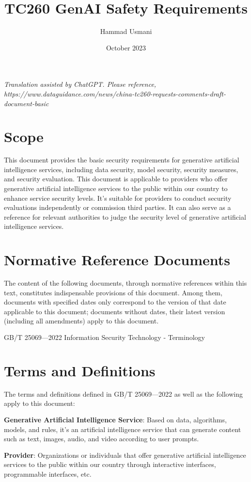 \documentclass{article}
\title{TC260 GenAI Safety Requirements}
\author{Hammad Usmani}
\date{October 2023}
\begin{document}
\maketitle

\tableofcontents
\newpage


\textit{Translation assisted by ChatGPT. Please reference, \\
https://www.dataguidance.com/news/china-tc260-requests-comments-draft-document-basic}

\section{Scope}
This document provides the basic security requirements for generative artificial intelligence services, including data security, model security, security measures, and security evaluation. This document is applicable to providers who offer generative artificial intelligence services to the public within our country to enhance service security levels. It's suitable for providers to conduct security evaluations independently or commission third parties. It can also serve as a reference for relevant authorities to judge the security level of generative artificial intelligence services.

\section{Normative Reference Documents}
The content of the following documents, through normative references within this text, constitutes indispensable provisions of this document. Among them, documents with specified dates only correspond to the version of that date applicable to this document; documents without dates, their latest version (including all amendments) apply to this document.

\noindent GB/T 25069—2022 Information Security Technology - Terminology
\section{Terms and Definitions}
The terms and definitions defined in GB/T 25069—2022 as well as the following apply to this document:

\textbf{Generative Artificial Intelligence Service}: Based on data, algorithms, models, and rules, it's an artificial intelligence service that can generate content such as text, images, audio, and video according to user prompts.

\textbf{Provider}: Organizations or individuals that offer generative artificial intelligence services to the public within our country through interactive interfaces, programmable interfaces, etc.
\end{document}
